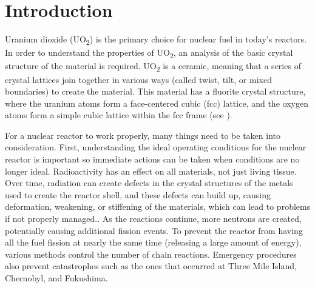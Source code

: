 \documentclass[twoside,senior]{BYUPhys}
\begin{document}
 \frontmatter

 \makepreliminarypages

 \singlespace

 \tableofcontents
 \clearemptydoublepage

 \listoffigures
 \clearemptydoublepage

 \doublespace

 \mainmatter


\chapter{Introduction\label{intro}}
Uranium dioxide (UO\textsubscript{2}) is the primary choice for nuclear fuel in today's reactors.\cite{uraniumInfo}  In order to understand the properties of UO\textsubscript{2}, an analysis of the basic crystal structure of the material is required.  UO\textsubscript{2} is a ceramic, meaning that a series of crystal lattices join together in various ways (called twist, tilt, or mixed boundaries) to create the material.  This material has a fluorite crystal structure, where the uranium atoms form a face-centered cubic (fcc) lattice, and the oxygen atoms form a simple cubic lattice within the fcc frame (see ).

For a nuclear reactor to work properly, many things need to be taken into consideration.  First, understanding the ideal operating conditions for the nuclear reactor is important so immediate actions can be taken when conditions are no longer ideal.  Radioactivity has an effect on all materials, not just living tissue.  Over time, radiation can create defects in the crystal structures of the metals used to create the reactor shell, and these defects can build up, causing deformation, weakening, or stiffening of the materials, which can lead to problems if not properly managed.\cite{callister2003}.  As the reactions continue, more neutrons are created, potentially causing additional fission events.  To prevent the reactor from having all the fuel fission at nearly the same time (releasing a large amount of energy), various methods control the number of chain reactions.  Emergency procedures also prevent catastrophes such as the ones that occurred at Three Mile Island, Chernobyl, and Fukushima.
\end{document}
